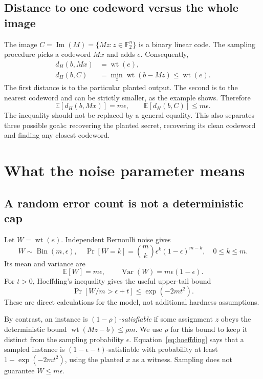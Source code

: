 \documentclass[11pt,a4paper]{article}
\newcommand{\F}{\mathbb F}
\newcommand{\E}{\mathbb E}
\newcommand{\wt}{\operatorname{wt}}
\newcommand{\Image}{\operatorname{Im}}
\newcommand{\Bin}{\operatorname{Bin}}
\begin{document}
\subsection{Distance to one codeword versus the whole image}
The image $C=\Image(M)=\{Mz:z\in\F_2^n\}$ is a binary linear code. The sampling procedure picks a codeword $Mx$ and adds $e$. Consequently,
\begin{align}
 d_H(b,Mx)&=\wt(e),\\
 d_H(b,C)&=\min_z\wt(b-Mz)\leq\wt(e).\label{eq:distance}
\end{align}
The first distance is to the particular planted output. The second is to the nearest codeword and can be strictly smaller, as the example shows. Therefore
\[
 \E[d_H(b,Mx)]=m\epsilon,\qquad \E[d_H(b,C)]\leq m\epsilon.
\]
The inequality should not be replaced by a general equality. This also separates three possible goals: recovering the planted secret, recovering its clean codeword and finding any closest codeword.

\section{What the noise parameter means}\label{sec:noise}
\subsection{A random error count is not a deterministic cap}
Let $W=\wt(e)$. Independent Bernoulli noise gives
\begin{equation}
 W\sim\Bin(m,\epsilon),\quad
 \Pr[W=k]=\binom mk\epsilon^k(1-\epsilon)^{m-k},\quad 0\leq k\leq m.
\end{equation}
Its mean and variance are
\begin{equation}\E[W]=m\epsilon,\qquad\operatorname{Var}(W)=m\epsilon(1-\epsilon).\end{equation}
For $t>0$, Hoeffding's inequality gives the useful upper-tail bound
\begin{equation}\Pr[W/m>\epsilon+t]\leq\exp(-2mt^2).\label{eq:hoeffding}\end{equation}
These are direct calculations for the model, not additional hardness assumptions.

By contrast, an instance is \emph{$(1-\rho)$-satisfiable} if some assignment $z$ obeys the deterministic bound $\wt(Mz-b)\leq\rho m$. We use $\rho$ for this bound to keep it distinct from the sampling probability $\epsilon$. Equation~\eqref{eq:hoeffding} says that a sampled instance is $(1-\epsilon-t)$-satisfiable with probability at least $1-\exp(-2mt^2)$, using the planted $x$ as a witness. Sampling does not guarantee $W\leq m\epsilon$.
\end{document}

